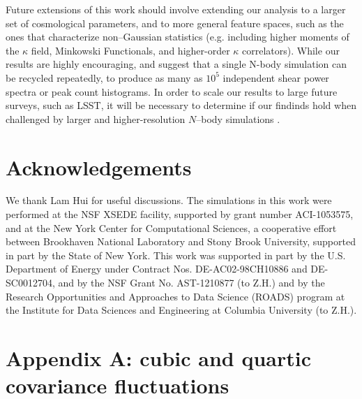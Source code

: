 \documentclass[reprint,aps,prd,superscriptaddress,showkeys,showpacs]{revtex4-1}
\begin{document}
%
Future extensions of this work should involve extending our analysis
to a larger set of cosmological parameters, and to more general
feature spaces, such as the ones that characterize non--Gaussian
statistics (e.g. including higher moments of the $\kappa$ field,
Minkowski Functionals, and higher-order $\kappa$ correlators). While
our results are highly encouraging, and suggest that a single N-body
simulation can be recycled repeatedly, to produce as many as $10^5$
independent shear power spectra or peak count histograms. In order to
scale our results to large future surveys, such as LSST, it will be
necessary to determine if our findinds hold when challenged by larger
and higher-resolution $N$--body simulations \citep{Qcontinuum}.

 

\section*{Acknowledgements}
We thank Lam Hui for useful discussions.  The simulations in this work
were performed at the NSF XSEDE facility, supported by grant number
ACI-1053575, and at the New York Center for Computational Sciences, a
cooperative effort between Brookhaven National Laboratory and Stony
Brook University, supported in part by the State of New York. This
work was supported in part by the U.S. Department of Energy under
Contract Nos. DE-AC02-98CH10886 and DE-SC0012704, and by the NSF Grant
No. AST-1210877 (to Z.H.) and by the Research Opportunities and
Approaches to Data Science (ROADS) program at the Institute for Data
Sciences and Engineering at Columbia University (to Z.H.).  



\section*{Appendix A: cubic and quartic covariance fluctuations}
\label{appendixA}
\end{document}
